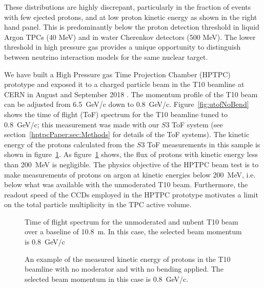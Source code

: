 These distributions are highly discrepant, particularly in the fraction of events with few ejected protons, and at low proton kinetic energy as shown in the right hand panel.
This is predominantly below the proton detection threshold in liquid Argon TPCs (40 MeV) and in water Cherenkov detectors (500 MeV).
The lower threshold in high pressure gas provides a unique opportunity to distinguish between neutrino interaction models for the same nuclear target.

We have built a High Pressure gas Time Projection Chamber (HPTPC) prototype and exposed it to a charged particle beam in the T10 beamline at CERN in August and September 2018 \cite{SPSC-P-355}.
The momentum profile of the T10 beam can be adjusted from 6.5~GeV/c down to 0.8~GeV/c. 
Figure~\ref{fig:utofNoBend} shows the time of flight (ToF) spectrum for the T10 beamline tuned to 0.8~GeV/c; this measurement was made with our $\mathit{S3}$ ToF system (see section~\ref{hptpcPaper:sec:Methods} for details of the ToF systems).
The kinetic energy of the protons calculated from the $\mathit{S3}$ ToF measurements in this sample is shown in figure~\ref{fig:keNoBend}.
As figure~\ref{fig:keNoBend} shows, the flux of protons with kinetic energy less than 200~MeV is negligible.
The physics objective of the HPTPC beam test is to make measurements of protons on argon at kinetic energies below 200~MeV, i.e. below what was available with the unmoderated T10 beam. 
Furthermore, the readout speed of the CCDs employed in the HPTPC prototype motivates a limit on the total particle multiplicity in the TPC active volume.

\begin{figure}
  \begin{minipage}[t]{0.49\textwidth}
    \centering
    \begin{adjustbox}{max totalsize={\textwidth},center}
      
    \end{adjustbox}
    \caption{Time of flight spectrum for the unmoderated and unbent T10 beam over a baseline of 10.8~m. In this case, the selected beam momentum is 0.8~GeV/c}
    \label{fig:utofNoBend}
  \end{minipage}
  \hfill
  \begin{minipage}[t]{0.49\textwidth}
    \centering
    \begin{adjustbox}{max totalsize={\textwidth},center}
      
    \end{adjustbox}
    \caption{An example of the measured kinetic energy of protons in the T10 beamline with no moderator and with no bending applied. The selected beam momentum in this case is 0.8~GeV/c.}
    \label{fig:keNoBend}
  \end{minipage}
\end{figure}

